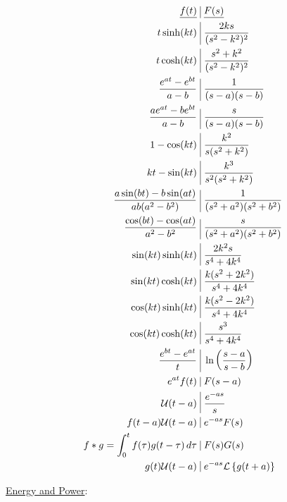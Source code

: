 \begin{multicols}{2}
\begin{equation*}
  \begin{split}
    \underline{f(t)}\,\,&\vline\,\,\underline{F(s)}\\
    t\sinh(kt)\,\,&\vline\,\,\frac{2ks}{(s^2-k^2)^2}\\
    t\cosh(kt)\,\,&\vline\,\,\frac{s^2+k^2}{(s^2-k^2)^2}\\
    \frac{e^{at}-e^{bt}}{a-b}\,\,&\vline\,\,\frac{1}{(s-a)(s-b)}\\
    \frac{ae^{at}-be^{bt}}{a-b}\,\,&\vline\,\,\frac{s}{(s-a)(s-b)}\\
    1-\cos(kt)\,\,&\vline\,\,\frac{k^2}{s(s^2+k^2)}\\
    kt-\sin(kt)\,\,&\vline\,\,\frac{k^3}{s^2(s^2+k^2)}\\
    \frac{a\sin(bt)-b\sin(at)}{ab(a^2-b^2)}\,\,&\vline\,\,\frac{1}{(s^2+a^2)(s^2+b^2)}\\
    \frac{\cos(bt)-\cos(at)}{a^2-b^2}\,\,&\vline\,\,\frac{s}{(s^2+a^2)(s^2+b^2)}\\
    \sin(kt)\sinh(kt)\,\,&\vline\,\,\frac{2k^2s}{s^4+4k^4}\\
    \sin(kt)\cosh(kt)\,\,&\vline\,\,\frac{k(s^2+2k^2)}{s^4+4k^4}\\
    \cos(kt)\sinh(kt)\,\,&\vline\,\,\frac{k(s^2-2k^2)}{s^4+4k^4}\\
    \cos(kt)\cosh(kt)\,\,&\vline\,\,\frac{s^3}{s^4+4k^4}\\
    \frac{e^{bt}-e^{at}}{t}\,\,&\vline\,\,\ln\left(\frac{s-a}{s-b}\right)\\
    e^{at}f(t)\,\,&\vline\,\,F(s-a)\\
    \mathcal{U}(t-a)\,\,&\vline\,\,\frac{e^{-as}}{s}\\
    f(t-a)\mathcal{U}(t-a)\,\,&\vline\,\,e^{-as}F(s)\\
    f\ast g=\int_0^t f(\tau)g(t-\tau)\,d\tau\,\,&\vline\,\,F(s)G(s)\\
    g(t)\mathcal{U}(t-a)\,\,&\vline\,\,e^{-as}\mathcal{L}\left\{ g(t+a) \right\}\\
  \end{split}
  \label{2}
  \end{equation*}

\end{multicols}

  \begin{center}
    \vspace{-7pt}
    \underline{Energy and Power}:
  \end{center}

  \vspace{-33pt}

